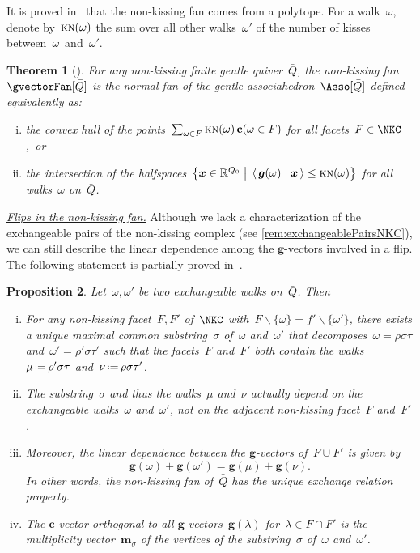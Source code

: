 \documentclass{amsart}
\newtheorem{theorem}{Theorem}[section]
\newtheorem{proposition}[theorem]{Proposition}
\theoremstyle{definition}
\newcommand{\R}{\mathbb{R}} %
\renewcommand{\b}[1]{{\boldsymbol{#1}}} %
\newcommand{\bigset}[2]{\big\{ #1 \;\big|\; #2 \big\}} %
\newcommand{\ssm}{\smallsetminus} %
\newcommand{\dotprod}[2]{\left\langle \, #1 \; \middle| \; #2 \, \right\rangle} %
\newcommand{\eqdef}{\mbox{\,\raisebox{0.2ex}{\scriptsize\ensuremath{\mathrm:}}\ensuremath{=}\,}} %
\newcommand{\darkblue}{\color{darkblue}} %
\newcommand{\defn}[1]{\textsl{\darkblue #1}} %
\newcommand{\para}[1]{\medskip\noindent\uline{\textit{#1.}}} %
\newcommand{\multiplicityVector}{\b{m}} %
\newcommand{\gvector}[1]{\b{g}(#1)} %
\newcommand{\cvector}[2]{\mathbf{c}(#2 \in #1)} %
\newcommand{\quiver}{\bar Q} %
\newcommand{\KN}{\textsc{kn}} %
\begin{document}
It is proved in~\cite[Thm.~4.27]{PaluPilaudPlamondon-nonkissing} that the non-kissing fan comes from a polytope.
For a walk~$\omega$, denote by~$\KN(\omega)$ the sum over all other walks~$\omega'$ of the number of kisses between~$\omega$~and~$\omega'$.

\begin{theorem}[{\cite[Thm.~4.27]{PaluPilaudPlamondon-nonkissing}}]
For any non-kissing finite gentle quiver~$\quiver$, the non-kissing fan~$\gvectorFan[\quiver]$ is the normal fan of the \defn{gentle associahedron}~$\Asso[\quiver]$ defined equivalently as:
\begin{enumerate}[(i)]
\item the convex hull of the points~$\sum_{\omega \in F} \KN(\omega) \, \cvector{F}{\omega}$ for all facets~${F \in \NKC}$,~or
\item the intersection of the halfspaces~$\bigset{\b{x} \in \R^{Q_0}}{\dotprod{\gvector{\omega}}{\b{x}} \le \KN(\omega)}$ for all walks~$\omega$ on~$\bar Q$.
\end{enumerate}
\end{theorem}

\para{Flips in the non-kissing fan}
%
Although we lack a characterization of the exchangeable pairs of the non-kissing complex (see \cref{rem:exchangeablePairsNKC}), we can still describe the linear dependence among the $\b{g}$-vectors involved in a flip.
The following statement is partially proved in~\cite[Thm.~4.17]{PaluPilaudPlamondon-nonkissing}.

\begin{proposition}
\label{prop:exchangeablePairsNKC}
Let~$\omega, \omega'$ be two exchangeable walks on~$\quiver$. Then
\begin{enumerate}[(i)]
\item For any non-kissing facet~$F, F'$ of~$\NKC$ with~$F \ssm \{\omega\} = f' \ssm \{\omega'\}$, there exists a unique maximal common substring~$\sigma$ of~$\omega$ and~$\omega'$ that decomposes~$\omega = \rho \sigma \tau$ and~$\omega' = \rho' \sigma \tau'$ such that the facets~$F$ and~$F'$ both contain the walks~$\mu \eqdef \rho' \sigma \tau$ and~$\nu \eqdef \rho \sigma \tau'$.
\item The substring~$\sigma$ and thus the walks~$\mu$ and~$\nu$ actually depend on the exchangeable walks~$\omega$ and~$\omega'$, not on the adjacent non-kissing facet~$F $ and~$F'$.
\item Moreover, the linear dependence between the $\b{g}$-vectors of~$F \cup F'$ is given by
\[
\gvector{\omega} + \gvector{\omega'} = \gvector{\mu} + \gvector{\nu}.
\]
In other words, the non-kissing fan of~$\quiver$ has the unique exchange relation property.
\item The $\b{c}$-vector orthogonal to all $\b{g}$-vectors~$\gvector{\lambda}$ for~$\lambda \in F \cap F'$ is the multiplicity vector~$\multiplicityVector_{\sigma}$ of the vertices of the substring~$\sigma$ of~$\omega$ and~$\omega'$.
\end{enumerate}
\end{proposition}
\end{document}
